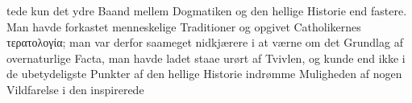 \documentclass[12pt]{book}
\newcommand{\opage}[1]{\marginnote{\footnotesize\textit{[#1]}}}
\begin{document}
\opage{80}\setcounter{footnote}{0}%
tede kun det ydre Baand mellem Dogmatiken og den hellige Historie end
fastere. Man havde forkastet menneskelige Traditioner og opgivet
Catholikernes τερατολογία; man var derfor saameget nidkjærere i at værne om
det Grundlag af overnaturlige Facta, man havde ladet staae urørt af Tvivlen,
og kunde end ikke i de ubetydeligste Punkter af den hellige Historie
indrømme Muligheden af nogen Vildfarelse i den inspirerede
\end{document}
